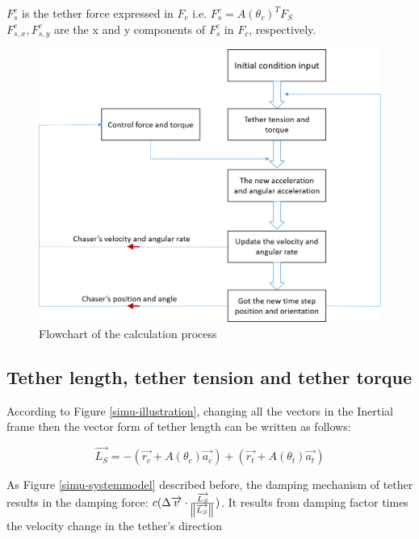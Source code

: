 \quad $F_{s}^c$ is the tether force expressed in $F_c$ i.e. $F_{s}^c = A(\theta_c)^TF_S$\\
\quad $F_{s,x}^c,F_{s,y}^c$ are the x and y components of $F_{s}^c$ in $F_c$, respectively.

\begin{figure}
\centering
\includegraphics[width=\textwidth]{fig/simulation/flowchart}
\caption{Flowchart of the calculation process}\label{simu-flowchart}
\end{figure}

\subsection{Tether length, tether tension and tether torque}

According to Figure \ref{simu-illustration}, changing all the vectors in the Inertial frame then the vector form of tether length can be written as follows:

\begin{equation} \overrightarrow{L_S} = -(\overrightarrow{r_c} + A(\theta_c)\overrightarrow{a_c})+(\overrightarrow{r_t} + A(\theta_t)\overrightarrow{a_t})\end{equation}
 

As Figure \ref{simu-systemmodel} described before, the damping mechanism of tether results in the damping force: $c(\Delta\overrightarrow{v}\cdot \frac{\overrightarrow{L_S}}{\norm{\overrightarrow{L_S}}}) $. It results from damping factor times the velocity change in the tether's direction

